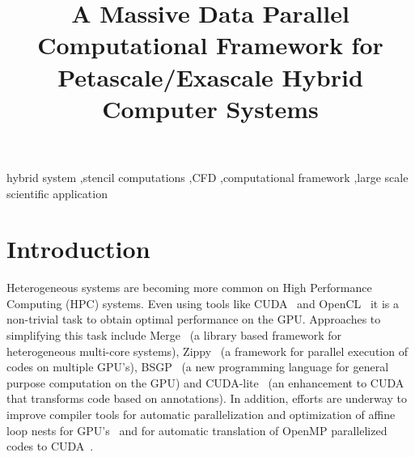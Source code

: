 \documentclass{IOS-Book-Article}
\begin{document}
\begin{frontmatter}

\title{A Massive Data Parallel Computational Framework for Petascale/Exascale Hybrid Computer Systems}


\author[poznan]{ }
\author[cct,cslsu]{ }
\author[cct,phlsu] { }
\author[ecelsu]{ }
\author[poznan]{ }
\author[cct]{ }
\author[pi,cct,guelph]{ }
\author[cct]{ }

\address[poznan]{Applications Department, Pozna\'{n} Supercomputing and Networking Center, Poland}
\address[cct]{Center for Computation \& Technology, Louisiana State University, Baton Rouge, USA}
\address[cslsu]{Department of Computer Science, Louisiana State University, Baton Rouge, USA}
\address[phlsu]{Department of Physics \& Astronomy, Louisiana State University, Baton Rouge, USA}
\address[ecelsu]{Department of Electrical and Computer Engineering, Louisiana State University, Baton Rouge, USA}
\address[pi]{Perimeter Institute for Theoretical Physics, Waterloo, Canada}
\address[guelph]{Department of Physics, University of Guelph, Guelph, Canada}

\begin{keyword}
hybrid system \sep stencil computations \sep CFD \sep computational framework \sep large scale scientific application
\end{keyword}
\end{frontmatter}

\thispagestyle{empty}
\pagestyle{empty}

\section*{Introduction}
Heterogeneous systems are becoming more common on High Performance Computing (HPC) systems.
Even using tools like 
CUDA~\cite{cuda40} and OpenCL~\cite{opencl11}
it is a non-trivial task to obtain optimal performance on
the GPU. Approaches to simplifying this task include 
Merge~\cite{Linderman:2008:MPM:1353536.1346318} (a library based framework
for heterogeneous multi-core systems), Zippy~\cite{CGF:CGF1131} (a framework
for parallel execution of codes on multiple GPU's), 
BSGP~\cite{Hou:2008:BBG:1360612.1360618} (a new programming language for
general purpose computation on the GPU) and 
CUDA-lite~\cite{springerlink:10.1007/978-3-540-89740-8_1} (an enhancement to
CUDA that transforms code based on annotations).
In addition, efforts are underway to improve compiler tools
for automatic parallelization and optimization of affine loop
nests for GPU's~\cite{Baskaran:2008:CFO:1375527.1375562} and for automatic
translation of OpenMP parallelized codes to 
CUDA~\cite{Lee:2009:OGC:1594835.1504194}.
\end{document}
